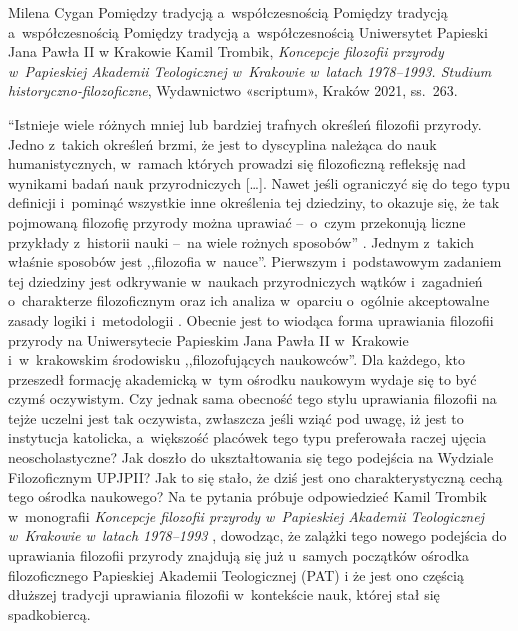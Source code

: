 \begin{newrevplenv}{Milena Cygan}
	{Pomiędzy tradycją a~współczesnością}
	{Pomiędzy tradycją a~współczesnością}
	{Pomiędzy tradycją a~współczesnością}
	{Uniwersytet Papieski Jana Pawła II w Krakowie}
	{Kamil Trombik, \textit{Koncepcje filozofii przyrody w~Papieskiej Akademii Teologicznej w~Krakowie w~latach 1978--1993. Studium historyczno-filozoficzne}, Wydawnictwo «scriptum», Kraków 2021, ss.~263.}




\lettrine[loversize=0.13,lines=2,lraise=-0.03,nindent=0em,findent=0.2pt]%
{``I}{}stnieje wiele różnych mniej lub bardziej trafnych określeń filozofii przyrody. Jedno z~takich określeń brzmi, że jest to dyscyplina należąca do nauk humanistycznych, w~ramach których prowadzi się filozoficzną refleksję nad wynikami badań nauk przyrodniczych […]. Nawet jeśli ograniczyć się do tego typu definicji i~pominąć wszystkie inne określenia tej dziedziny, to okazuje się, że tak pojmowaną filozofię przyrody można uprawiać --~o~czym przekonują liczne przykłady z~historii nauki --~na wiele rożnych sposobów''
\parencite[][s.~12]{heller_elementy_2007}. %
 Jednym z~takich właśnie sposobów jest ,,filozofia w~nauce''. Pierwszym i~podstawowym zadaniem tej dziedziny jest odkrywanie w~naukach przyrodniczych wątków i~zagadnień o~charakterze filozoficznym oraz ich analiza w~oparciu o~ogólnie akceptowalne zasady logiki i~metodologii 
\parencites[][]{heller_how_2019}[zob. także][]{polak_philosophy_2019}. %
Obecnie jest to wiodąca forma uprawiania filozofii przyrody na Uniwersytecie Papieskim Jana Pawła II w~Krakowie i~w~krakowskim środowisku ,,filozofujących naukowców''. Dla każdego, kto przeszedł formację akademicką w~tym ośrodku naukowym wydaje się to być czymś oczywistym. Czy jednak sama obecność tego stylu uprawiania filozofii na tejże uczelni jest tak oczywista, zwłaszcza jeśli wziąć pod uwagę, iż jest to instytucja katolicka, a~większość placówek tego typu preferowała raczej ujęcia neoscholastyczne? Jak doszło do ukształtowania się tego podejścia na Wydziale Filozoficznym UPJPII? Jak to się stało, że dziś jest ono charakterystyczną cechą tego ośrodka naukowego? Na te pytania próbuje odpowiedzieć Kamil Trombik w~monografii \textit{Koncepcje filozofii przyrody w~Papieskiej Akademii Teologicznej w~Krakowie w~latach 1978--1993}
\parencite*[][]{trombik_koncepcje_2021}, %
 dowodząc, że zalążki tego nowego podejścia do uprawiania filozofii przyrody znajdują się już u~samych początków ośrodka filozoficznego Papieskiej Akademii Teologicznej (PAT) i że jest ono częścią dłuższej tradycji uprawiania filozofii w~kontekście nauk, której stał się  spadkobiercą.


\end{newrevplenv}
